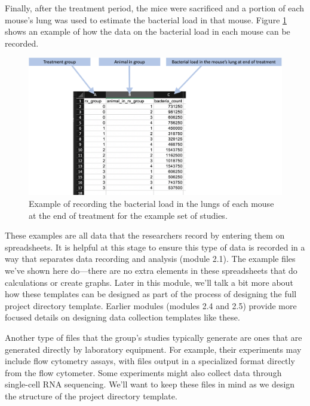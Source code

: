 \documentclass[]{tufte-book}
\begin{document}
Finally, after the treatment period, the mice were sacrificed and a portion of
each mouse's lung was used to estimate the bacterial load in that mouse. Figure
\ref{fig:bacterialload} shows an example of how the data on the bacterial load
in each mouse can be recorded.

\begin{figure}
\includegraphics[width=\textwidth]{figures/project_bacterial_load} \caption[Example of recording the bacterial load in the lungs of each mouse at the end of treatment for the example set of studies]{Example of recording the bacterial load in the lungs of each mouse at the end of treatment for the example set of studies.}\label{fig:bacterialload}
\end{figure}

These examples are all data that the researchers record by entering them on
spreadsheets. It is helpful at this stage to ensure this type of data is
recorded in a way that separates data recording and analysis (module 2.1).
The example files we've shown here do---there are no extra elements in these
spreadsheets that do calculations or create graphs. Later in this module, we'll
talk a bit more about how these templates can be designed as part of the
process of designing the full project directory template. Earlier modules
(modules 2.4 and 2.5) provide more focused details on designing data collection
templates like these.

Another type of files that the group's studies typically generate are ones
that are generated directly by laboratory equipment. For example, their
experiments may include flow cytometry assays, with files output in a
specialized format directly from the flow cytometer. Some experiments might
also collect data through single-cell RNA sequencing. We'll want to keep
these files in mind as we design the structure of the project directory
template.
\end{document}
